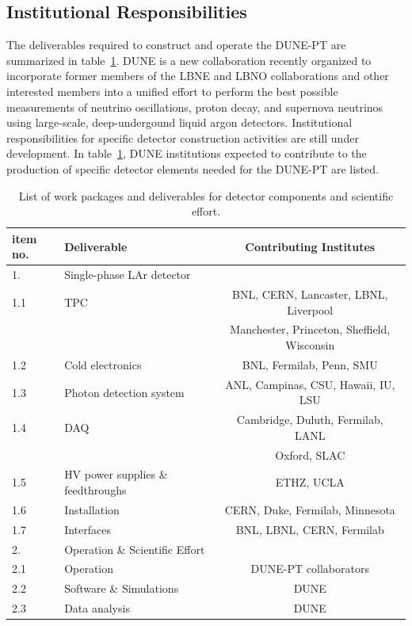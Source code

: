 \subsection{Institutional Responsibilities}

The deliverables required to construct and operate the DUNE-PT are summarized in table~\ref{tab:wbs-detector}.  DUNE is a new collaboration 
recently organized to incorporate former members of the LBNE and LBNO collaborations and other interested members into a unified 
effort to perform the best possible measurements of neutrino oscillations, proton decay, and supernova neutrinos using large-scale, 
deep-undergound liquid argon detectors.  Institutional responsibilities for specific detector construction activities are still 
under development.  In table~\ref{tab:wbs-detector}, DUNE institutions expected to contribute to the production of specific detector elements 
needed for the DUNE-PT are listed. 
%
\begin{table}[h]
\centering
\begin{tabular}{|l l c|}
\hline
\textbf{item no. } & \textbf{Deliverable}  & \textbf{Contributing Institutes}  \\ \hline

1.   & Single-phase LAr detector & \\
1.1  & TPC & BNL, CERN, Lancaster, LBNL, Liverpool \\
  &  & Manchester, Princeton, Sheffield, Wisconsin \\
1.2  & Cold electronics  & BNL, Fermilab, Penn, SMU \\ 
1.3  & Photon detection system  &  ANL, Campinas, CSU, Hawaii, IU, LSU \\
1.4  & DAQ & Cambridge, Duluth,  Fermilab, LANL \\
       &          & Oxford, SLAC \\
1.5  & HV power supplies \& feedthroughs  &  ETHZ, UCLA \\
1.6  & Installation & CERN, Duke, Fermilab, Minnesota \\ 
1.7  & Interfaces  & BNL, LBNL, CERN, Fermilab  \\ \hline

2.   & Operation \& Scientific Effort & \\ 
2.1 & Operation & DUNE-PT collaborators \\
2.2  & Software \& Simulations &  DUNE \\
2.3  & Data analysis &  DUNE \\ \hline

\end{tabular}
\caption{List of work packages and deliverables for detector components and scientific effort.} 
\label{tab:wbs-detector}
\end{table}

